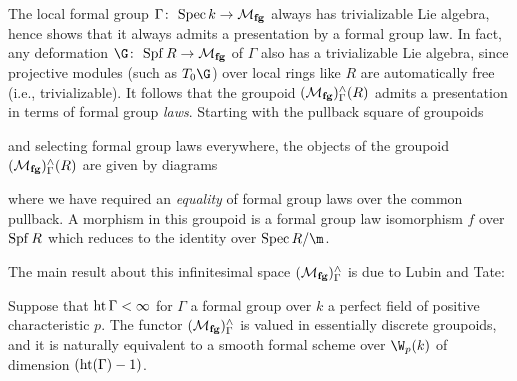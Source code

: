 \begin{remark}\label{LubinTateStackInFGLTerms}
The local formal group $\Gamma\colon\thinspace \operatorname{Spec} k \to \mathcal{M}_{\mathbf{fg}}$ always has trivializable Lie algebra, hence  shows that it always admits a presentation by a formal group law.  In fact, any deformation $\G\co \Spf R \to \moduli{fg}$ of $\Gamma$ also has a trivializable Lie algebra, since projective modules (such as $T_0 \G$) over local rings like $R$ are automatically free (i.e., trivializable).  It follows that the groupoid $(\mathcal{M}_{\mathbf{fg}})^\wedge_\Gamma(R)$ admits a presentation in terms of formal group \emph{laws}.  Starting with the pullback square of groupoids
\begin{center}
\end{center}
and selecting formal group laws everywhere, the objects of the groupoid $(\mathcal{M}_{\mathbf{fg}})^\wedge_\Gamma(R)$ are given by diagrams
\begin{center}
\end{center}
where we have required an \emph{equality} of formal group laws over the common pullback.  A morphism in this groupoid is a formal group law isomorphism $f$ over $\operatorname{Spf} R$ which reduces to the identity over $\Spec R/\m$.
\end{remark}

The main result about this infinitesimal space $(\mathcal{M}_{\mathbf{fg}})^\wedge_\Gamma$ is due to Lubin and Tate:
\begin{theorem}\label{LubinTateModuliThm}
Suppose that $\operatorname{ht} \Gamma < \infty$ for $\Gamma$ a formal group over $k$ a perfect field of positive characteristic $p$.  The functor $(\mathcal{M}_{\mathbf{fg}})^\wedge_\Gamma$ is valued in essentially discrete groupoids, and it is naturally equivalent to a smooth formal scheme over $\W_p(k)$ of dimension $(\operatorname{ht}(\Gamma) - 1)$.
\end{theorem}

